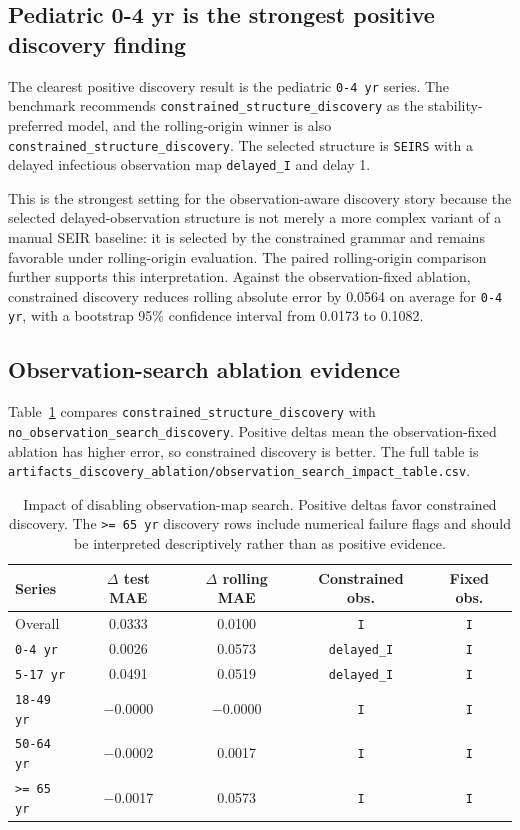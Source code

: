 \subsection{Pediatric 0-4 yr is the strongest positive discovery finding}

The clearest positive discovery result is the pediatric \texttt{0-4 yr}
series. The benchmark recommends
\texttt{constrained\_structure\_discovery} as the stability-preferred model,
and the rolling-origin winner is also
\texttt{constrained\_structure\_discovery}. The selected structure is
\texttt{SEIRS} with a delayed infectious observation map
\texttt{delayed\_I} and delay 1.

This is the strongest setting for the observation-aware discovery story
because the selected delayed-observation structure is not merely a more complex
variant of a manual SEIR baseline: it is selected by the constrained grammar
and remains favorable under rolling-origin evaluation. The paired
rolling-origin comparison further supports this interpretation. Against the
observation-fixed ablation, constrained discovery reduces rolling absolute
error by \num{0.0564} on average for \texttt{0-4 yr}, with a bootstrap
95\% confidence interval from \num{0.0173} to \num{0.1082}.

\subsection{Observation-search ablation evidence}

Table~\ref{tab:observation-search-impact} compares
\texttt{constrained\_structure\_discovery} with
\texttt{no\_observation\_search\_discovery}. Positive deltas mean the
observation-fixed ablation has higher error, so constrained discovery is
better. The full table is
\texttt{artifacts\_discovery\_ablation/observation\_search\_impact\_table.csv}.

\begin{table}[H]
\centering
\small
\caption{Impact of disabling observation-map search. Positive deltas favor
constrained discovery. The \texttt{>= 65 yr} discovery rows include numerical
failure flags and should be interpreted descriptively rather than as positive
evidence.}
\label{tab:observation-search-impact}
\begin{tabular}{lcccc}
\toprule
Series & $\Delta$ test MAE & $\Delta$ rolling MAE & Constrained obs. & Fixed obs. \\
\midrule
Overall & \num{0.0333} & \num{0.0100} & \texttt{I} & \texttt{I} \\
\texttt{0-4 yr} & \num{0.0026} & \num{0.0573} & \texttt{delayed\_I} & \texttt{I} \\
\texttt{5-17 yr} & \num{0.0491} & \num{0.0519} & \texttt{delayed\_I} & \texttt{I} \\
\texttt{18-49 yr} & \num{-0.0000} & \num{-0.0000} & \texttt{I} & \texttt{I} \\
\texttt{50-64 yr} & \num{-0.0002} & \num{0.0017} & \texttt{I} & \texttt{I} \\
\texttt{>= 65 yr} & \num{-0.0017} & \num{0.0573} & \texttt{I} & \texttt{I} \\
\bottomrule
\end{tabular}
\end{table}

